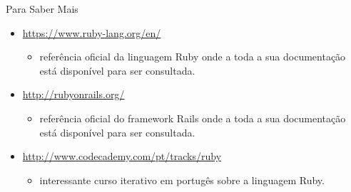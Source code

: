 \begin{frame}[fragile,t]{Para Saber Mais}
  \begin{itemize}
    \item \url{https://www.ruby-lang.org/en/}
    \begin{itemize}
     \item referência oficial da linguagem Ruby onde a toda a sua documentação está disponível
	para ser consultada.
    \end{itemize}

    \item \url{http://rubyonrails.org/}
    \begin{itemize}
     \item referência oficial do framework Rails onde a toda a sua documentação está disponível
	para ser consultada.
    \end{itemize}
    
    \item \url{http://www.codecademy.com/pt/tracks/ruby}
    \begin{itemize}
     \item interessante curso iterativo em portugês sobre a linguagem Ruby.
    \end{itemize}

  \end{itemize}
  
  
\end{frame}